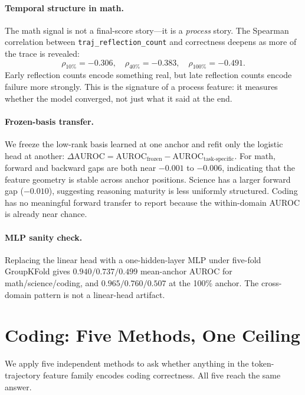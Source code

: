 \documentclass[10pt,twocolumn]{article}
\begin{document}
\paragraph{Temporal structure in math.} The math signal is not a final-score story—it is a \emph{process} story. The Spearman correlation between \texttt{traj\_reflection\_count} and correctness deepens as more of the trace is revealed:
\[
\rho_{10\%} = -0.306,\quad \rho_{40\%} = -0.383,\quad \rho_{100\%} = -0.491.
\]
Early reflection counts encode something real, but late reflection counts encode failure more strongly. This is the signature of a process feature: it measures whether the model converged, not just what it said at the end.

\paragraph{Frozen-basis transfer.} We freeze the low-rank basis learned at one anchor and refit only the logistic head at another: $\Delta\text{AUROC} = \text{AUROC}_{\text{frozen}} - \text{AUROC}_{\text{task-specific}}$. For math, forward and backward gaps are both near $-0.001$ to $-0.006$, indicating that the feature geometry is stable across anchor positions. Science has a larger forward gap ($-0.010$), suggesting reasoning maturity is less uniformly structured. Coding has no meaningful forward transfer to report because the within-domain AUROC is already near chance.

\paragraph{MLP sanity check.} Replacing the linear head with a one-hidden-layer MLP under five-fold GroupKFold gives $0.940/0.737/0.499$ mean-anchor AUROC for math/science/coding, and $0.965/0.760/0.507$ at the 100\% anchor. The cross-domain pattern is not a linear-head artifact.

\section{Coding: Five Methods, One Ceiling}
\label{sec:coding}

We apply five independent methods to ask whether anything in the token-trajectory feature family encodes coding correctness. All five reach the same answer.
\end{document}
